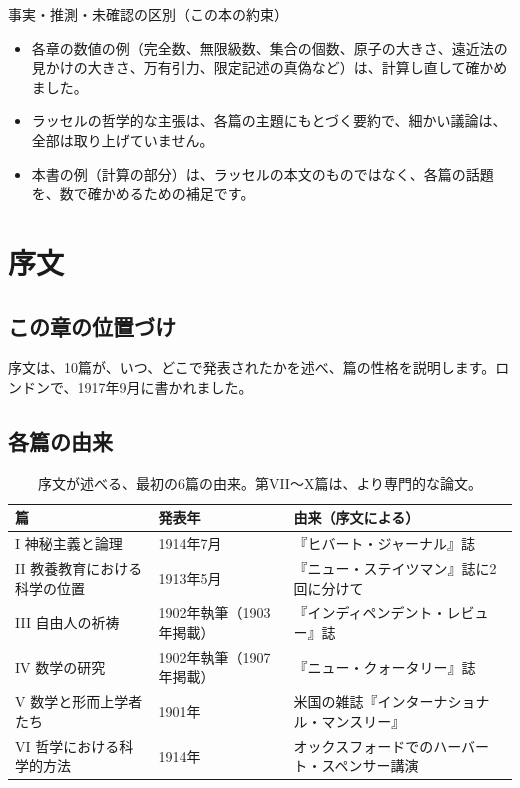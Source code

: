 \documentclass[a4paper,11pt,openany]{ltjsbook}
\begin{document}
\begin{notebox}{事実・推測・未確認の区別（この本の約束）}
\begin{itemize}[leftmargin=*]
\item 各章の数値の例（完全数、無限級数、集合の個数、原子の大きさ、遠近法の見かけの大きさ、万有引力、限定記述の真偽など）は、計算し直して確かめました。
\item ラッセルの哲学的な主張は、各篇の主題にもとづく要約で、細かい議論は、全部は取り上げていません。
\item 本書の例（計算の部分）は、ラッセルの本文のものではなく、各篇の話題を、数で確かめるための補足です。
\end{itemize}
\end{notebox}

\chapter{序文}

\section{この章の位置づけ}

序文は、10篇が、いつ、どこで発表されたかを述べ、篇の性格を説明します。ロンドンで、1917年9月に書かれました。

\section{各篇の由来}

\begin{table}[htbp]
\centering
\small
\begin{tabular}{llp{6.2cm}}
\toprule
篇 & 発表年 & 由来（序文による）\\
\midrule
I 神秘主義と論理 & 1914年7月 & 『ヒバート・ジャーナル』誌\\
II 教養教育における科学の位置 & 1913年5月 & 『ニュー・ステイツマン』誌に2回に分けて\\
III 自由人の祈祷 & 1902年執筆（1903年掲載） & 『インディペンデント・レビュー』誌\\
IV 数学の研究 & 1902年執筆（1907年掲載） & 『ニュー・クォータリー』誌\\
V 数学と形而上学者たち & 1901年 & 米国の雑誌『インターナショナル・マンスリー』\\
VI 哲学における科学的方法 & 1914年 & オックスフォードでのハーバート・スペンサー講演\\
\bottomrule
\end{tabular}
\caption{序文が述べる、最初の6篇の由来。第VII〜X篇は、より専門的な論文。}
\end{table}
\end{document}
